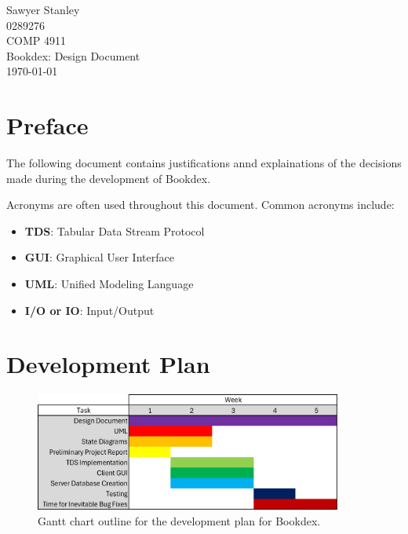 \documentclass{article}
\newcommand{\class}{COMP 4911}
\newcommand{\examnum}{Bookdex: Design Document}
\newcommand{\examdate}{\today}
\newcommand{\yourname}{Sawyer Stanley}
\newcommand{\studentid}{0289276}
\begin{document}
\pagestyle{plain}

\vspace*{\fill}
\begin{center}
    \yourname\\
    \studentid\\
    \class\\
    \examnum\\
    \examdate\\
\end{center}
\vspace*{\fill}

\thispagestyle{empty}
\newpage

\section{Preface}\label{sec:preface}
The following document contains justifications annd explainations of the decisions made during the development of Bookdex.

Acronyms are often used throughout this document. Common acronyms include:

\begin{itemize}
    \item \textbf{TDS}: Tabular Data Stream Protocol
    \item \textbf{GUI}: Graphical User Interface
    \item \textbf{UML}: Unified Modeling Language
    \item \textbf{I/O or IO}: Input/Output
\end{itemize}

\section{Development Plan}\label{sec:plan}

    \begin{figure}[h]\label{fig:gantt}
        \includegraphics[width=0.9\textwidth]{gantt_chart.png}
        \caption{Gantt chart outline for the development plan for Bookdex.}
    \end{figure}
\end{document}
